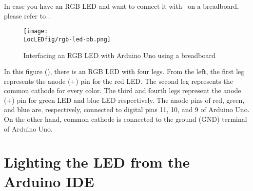 In case you have an RGB LED and want to connect it with \arduino\ on a breadboard, 
please refer to . 
\begin{figure}
  \centering
  \texttt{[image: \\LocLEDfig/rgb-led-bb.png]}
  \caption{Interfacing an RGB LED with Arduino Uno using a breadboard}
  \label{fig:ard-rgb-bread}
\end{figure}
In this figure (), there is an RGB LED with four legs. 
From the left, the first leg represents the anode (+) pin for the red LED. 
The second leg represents the common cathode for every color. 
The third and fourth legs represent the anode (+) pin for green LED and blue LED respectively. 
The anode pins of red, green, and blue are, respectively, connected to digital pins 11, 10, and 9 of Arduino Uno. 
On the other hand, common cathode is connected to the ground (GND) terminal of Arduino Uno. 

\section{Lighting the LED from the Arduino IDE}

